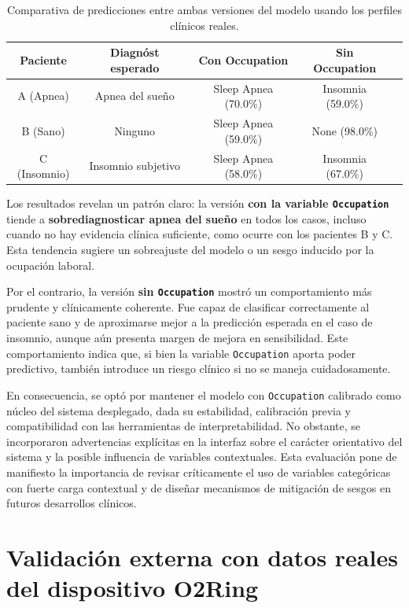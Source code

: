 \begin{table}[H]
\centering
\begin{tabular}{|c|c|c|c|c|}
\hline
\textbf{Paciente} & \textbf{Diagnóst esperado} & \textbf{Con Occupation} & \textbf{Sin Occupation} \\
\hline
A (Apnea)   & Apnea del sueño     & Sleep Apnea (70.0\%) & Insomnia (59.0\%) \\
B (Sano)    & Ninguno             & Sleep Apnea (59.0\%) & None (98.0\%) \\
C (Insomnio) & Insomnio subjetivo & Sleep Apnea (58.0\%) & Insomnia (67.0\%) \\
\hline
\end{tabular}
\caption{Comparativa de predicciones entre ambas versiones del modelo usando los perfiles clínicos reales.}
\end{table}


Los resultados revelan un patrón claro: la versión \textbf{con la variable \texttt{Occupation}} tiende a \textbf{sobrediagnosticar apnea del sueño} en todos los casos, incluso cuando no hay evidencia clínica suficiente, como ocurre con los pacientes B y C. Esta tendencia sugiere un sobreajuste del modelo o un sesgo inducido por la ocupación laboral.

Por el contrario, la versión \textbf{sin \texttt{Occupation}} mostró un comportamiento más prudente y clínicamente coherente. Fue capaz de clasificar correctamente al paciente sano y de aproximarse mejor a la predicción esperada en el caso de insomnio, aunque aún presenta margen de mejora en sensibilidad. Este comportamiento indica que, si bien la variable \texttt{Occupation} aporta poder predictivo, también introduce un riesgo clínico si no se maneja cuidadosamente.

En consecuencia, se optó por mantener el modelo con \texttt{Occupation} calibrado como núcleo del sistema desplegado, dada su estabilidad, calibración previa y compatibilidad con las herramientas de interpretabilidad. No obstante, se incorporaron advertencias explícitas en la interfaz sobre el carácter orientativo del sistema y la posible influencia de variables contextuales. Esta evaluación pone de manifiesto la importancia de revisar críticamente el uso de variables categóricas con fuerte carga contextual y de diseñar mecanismos de mitigación de sesgos en futuros desarrollos clínicos.


\section{Validación externa con datos reales del dispositivo O2Ring}

